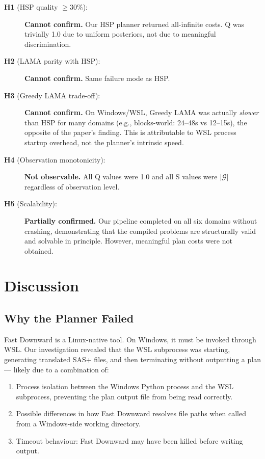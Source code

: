 \documentclass[10pt,twocolumn]{article}
\begin{document}
\begin{description}
  \item[\textbf{H1} (HSP quality $\geq 30\%$):] \textbf{Cannot confirm.} Our HSP planner returned all-infinite costs. Q was trivially 1.0 due to uniform posteriors, not due to meaningful discrimination.
  \item[\textbf{H2} (LAMA parity with HSP):] \textbf{Cannot confirm.} Same failure mode as HSP.
  \item[\textbf{H3} (Greedy LAMA trade-off):] \textbf{Cannot confirm.} On Windows/WSL, Greedy LAMA was actually \emph{slower} than HSP for many domains (e.g., blocks-world: 24--48s vs 12--15s), the opposite of the paper's finding. This is attributable to WSL process startup overhead, not the planner's intrinsic speed.
  \item[\textbf{H4} (Observation monotonicity):] \textbf{Not observable.} All Q values were 1.0 and all S values were $|\mathcal{G}|$ regardless of observation level.
  \item[\textbf{H5} (Scalability):] \textbf{Partially confirmed.} Our pipeline completed on all six domains without crashing, demonstrating that the compiled problems are structurally valid and solvable in principle. However, meaningful plan costs were not obtained.
\end{description}

\section{Discussion}

\subsection{Why the Planner Failed}

Fast Downward is a Linux-native tool. On Windows, it must be invoked through WSL. Our investigation revealed that the WSL subprocess was starting, generating translated SAS+ files, and then terminating without outputting a plan — likely due to a combination of:
\begin{enumerate}
  \item Process isolation between the Windows Python process and the WSL subprocess, preventing the plan output file from being read correctly.
  \item Possible differences in how Fast Downward resolves file paths when called from a Windows-side working directory.
  \item Timeout behaviour: Fast Downward may have been killed before writing output.
\end{enumerate}
\end{document}

